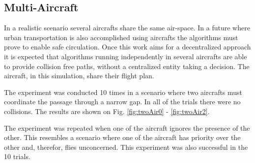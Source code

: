 \subsection{Multi-Aircraft}
In a realistic scenario several aircrafts share the same air-space. In a future where urban transportation is also accomplished using aircrafts the algorithms must prove to enable safe circulation. Once this work aims for a decentralized approach it is expected that algorithms running independently in several aircrafts are able to provide collision free paths, without a centralized entity taking a decision. The aircraft, in this simulation, share their flight plan.
\par
The experiment was conducted 10 times in a scenario where two aircrafts must coordinate the passage through a narrow gap. In all of the trials there were no collisions. The results are shown on Fig. \ref{fig:twoAir0} - \ref{fig:twoAir2}.

The experiment was repeated when one of the aircraft ignores the presence of the other. This resembles a scenario where one of the aircraft has priority over the other and, therefor, flies unconcerned. This experiment was also successful in the 10 trials.

